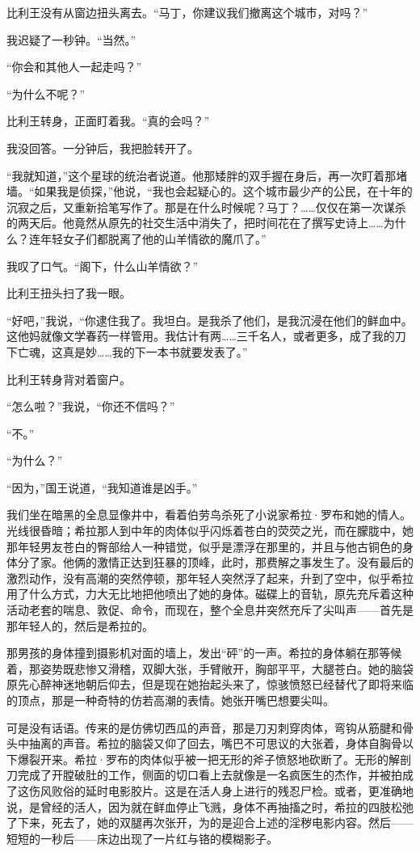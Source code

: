 \documentclass[AutoFakeBold=true]{book}
\begin{document}
比利王没有从窗边扭头离去。``马丁，你建议我们撤离这个城市，对吗？''

我迟疑了一秒钟。``当然。''

``你会和其他人一起走吗？''

``为什么不呢？''

比利王转身，正面盯着我。``真的会吗？''

我没回答。一分钟后，我把脸转开了。

``我就知道，''这个星球的统治者说道。他那矮胖的双手握在身后，再一次盯着那堵墙。``如果我是侦探，''他说，``我也会起疑心的。这个城市最少产的公民，在十年的沉寂之后，又重新拾笔写作了。那是在什么时候呢？马丁？……仅仅在第一次谋杀的两天后。他竟然从原先的社交生活中消失了，把时间花在了撰写史诗上……为什么？连年轻女子们都脱离了他的山羊情欲的魔爪了。''

我叹了口气。``阁下，什么山羊情欲？''

比利王扭头扫了我一眼。

``好吧，''我说，``你逮住我了。我坦白。是我杀了他们，是我沉浸在他们的鲜血中。这他妈就像文学春药一样管用。我估计有两……三千名人，或者更多，成了我的刀下亡魂，这真是妙……我的下一本书就要发表了。''

比利王转身背对着窗户。

``怎么啦？''我说，``你还不信吗？''

``不。''

``为什么？''

``因为，''国王说道，``我知道谁是凶手。''

\vspace*{1em}

我们坐在暗黑的全息显像井中，看着伯劳鸟杀死了小说家希拉·罗布和她的情人。光线很昏暗；希拉那人到中年的肉体似乎闪烁着苍白的荧荧之光，而在朦胧中，她那年轻男友苍白的臀部给人一种错觉，似乎是漂浮在那里的，并且与他古铜色的身体分了家。他俩的激情正达到狂暴的顶峰，此时，那费解之事发生了。没有最后的激烈动作，没有高潮的突然停顿，那年轻人突然浮了起来，升到了空中，似乎希拉用了什么方式，力大无比地把他喷出了她的身体。磁碟上的音轨，原先充斥着这种活动老套的喘息、敦促、命令，而现在，整个全息井突然充斥了尖叫声——首先是那年轻人的，然后是希拉的。

那男孩的身体撞到摄影机对面的墙上，发出``砰''的一声。希拉的身体躺在那等候着，那姿势既悲惨又滑稽，双脚大张，手臂敞开，胸部平平，大腿苍白。她的脑袋原先心醉神迷地朝后仰去，但是现在她抬起头来了，惊骇愤怒已经替代了即将来临的顶点，那是一种奇特的仿若高潮的表情。她张开嘴巴想要尖叫。

可是没有话语。传来的是仿佛切西瓜的声音，那是刀刃刺穿肉体，弯钩从筋腱和骨头中抽离的声音。希拉的脑袋又仰了回去，嘴巴不可思议的大张着，身体自胸骨以下爆裂开来。希拉·罗布的肉体似乎被一把无形的斧子愤怒地砍断了。无形的解剖刀完成了开膛破肚的工作，侧面的切口看上去就像是一名疯医生的杰作，并被拍成了这伤风败俗的延时电影胶片。这是在活人身上进行的残忍尸检。或者，更准确地说，是曾经的活人，因为就在鲜血停止飞溅，身体不再抽搐之时，希拉的四肢松弛了下来，死去了，她的双腿再次张开，为的是迎合上述的淫秽电影内容。然后——短短的一秒后——床边出现了一片红与铬的模糊影子。
\end{document}
